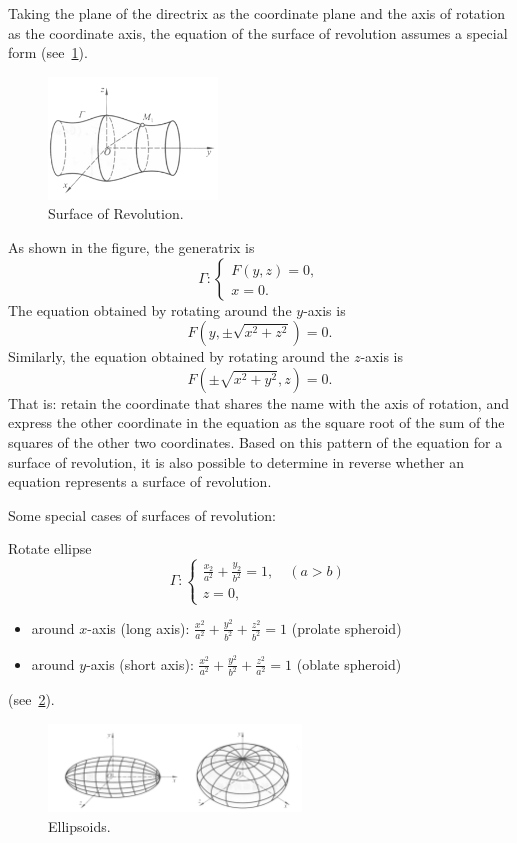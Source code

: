 \documentclass[11pt]{../../TexTemplate/elegantbook} %
\begin{document}
Taking the plane of the directrix as the coordinate plane and the axis of rotation as the coordinate axis, 
the equation of the surface of revolution assumes a special form (see~\ref{fig:SurfaceOfRevolution}).
\begin{figure}[h]
    \centering
    \includegraphics[width=0.4\textwidth]{img/Revolution.png}
    \caption{Surface of Revolution.}
    \label{fig:SurfaceOfRevolution}
\end{figure}
As shown in the figure, the generatrix is
\[
\Gamma: \begin{cases} F(y,z)=0, \\ x = 0. \end{cases}
\]
The equation obtained by rotating around the \(y\)-axis is
\[
F(y, \pm \sqrt{x^{2}+z^{2}}) = 0.
\]
Similarly, the equation obtained by rotating around the \(z\)-axis is 
\[
F(\pm \sqrt{x^{2}+y^{2}}, z) = 0.
\]
That is: retain the coordinate that shares the name with the axis of rotation, 
and express the other coordinate in the equation as the square root of the sum of the squares of the other two coordinates. 
Based on this pattern of the equation for a surface of revolution, 
it is also possible to determine in reverse whether an equation represents a surface of revolution.

\vspace{0.7cm}
Some special cases of surfaces of revolution:

\noindent Rotate ellipse
\[
\Gamma: \begin{cases} \frac{x_{2}}{a^{2}} + \frac{y_{2}}{b^{2}} = 1,\quad(a>b) \\ z = 0, \end{cases}
\]
\begin{itemize}
    \item around \(x\)-axis (long axis): \( \frac{x^{2}}{a^{2}} + \frac{y^{2}}{b^{2}} + \frac{z^{2}}{b^{2}} = 1\) (prolate spheroid) 
    \item around \(y\)-axis (short axis): \( \frac{x^{2}}{a^{2}} + \frac{y^{2}}{b^{2}} + \frac{z^{2}}{a^{2}} = 1\) (oblate spheroid)
\end{itemize}
(see~\ref{fig:Ellipsoids}).
\begin{figure}[h]
    \centering
    \includegraphics[width=0.6\textwidth]{img/ellipse.png}
    \caption{Ellipsoids.}
    \label{fig:Ellipsoids}
\end{figure}
\end{document}
